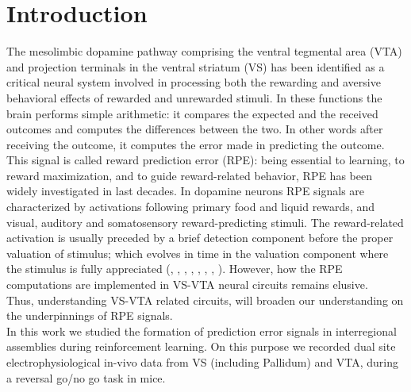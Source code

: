 \chapter{Introduction}
\label{chap:Introduction}
The mesolimbic dopamine pathway comprising the ventral tegmental area (VTA) and projection terminals in the ventral striatum (VS) has been identified as a critical neural system involved in processing both the rewarding and aversive behavioral effects of rewarded and unrewarded stimuli. In these functions the brain performs simple arithmetic: it compares the expected and the received outcomes and computes the differences between the two. In other words after receiving the outcome, it computes the error made in predicting the outcome. This signal is called reward prediction  error (RPE): being essential to learning, to reward maximization, and to guide reward-related behavior, RPE has been widely investigated in last decades. In dopamine neurons RPE signals are characterized by activations following primary food and liquid rewards, and visual, auditory and somatosensory reward-predicting stimuli. The reward-related activation is usually preceded by a brief detection component before the proper valuation of stimulus; which evolves in time in the valuation component where the stimulus is fully appreciated (\cite{Schultz2001}, \cite{Schultz2002}, \cite{Fiorillo}, \cite{Eshel1}, \cite{Pagnoni}, \cite{Radua}, \cite{Takahashi2016}, \cite{TianHuang}). However, how the RPE computations are implemented in VS-VTA neural circuits remains elusive.\\
Thus, understanding VS-VTA related circuits, will broaden our understanding on the underpinnings of RPE signals.\\In this work we studied the formation of prediction error signals in interregional assemblies during reinforcement learning. On this purpose we recorded dual site electrophysiological in-vivo data from VS (including Pallidum) and VTA, during a reversal go/no go task in mice.\\%
